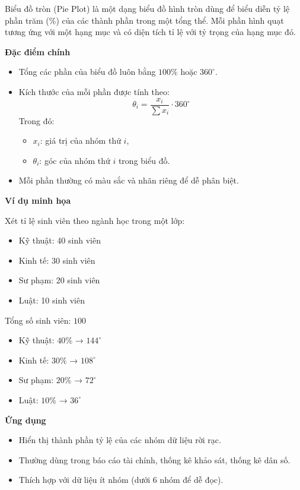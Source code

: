 Biểu đồ tròn (Pie Plot) là một dạng biểu đồ hình tròn dùng để biểu diễn tỷ lệ phần trăm (\%) của các thành phần trong một tổng thể. Mỗi phần hình quạt tương ứng với một hạng mục và có diện tích tỉ lệ với tỷ trọng của hạng mục đó.

\textbf{Đặc điểm chính}

\begin{itemize}
    \item Tổng các phần của biểu đồ luôn bằng \(100\%\) hoặc \(360^\circ\).
    \item Kích thước của mỗi phần được tính theo:
    \[
    \theta_i = \frac{x_i}{\sum x_i} \cdot 360^\circ
    \]
    Trong đó:
    \begin{itemize}
        \item \( x_i \): giá trị của nhóm thứ \(i\),
        \item \( \theta_i \): góc của nhóm thứ \(i\) trong biểu đồ.
    \end{itemize}
    \item Mỗi phần thường có màu sắc và nhãn riêng để dễ phân biệt.
\end{itemize}

\textbf{Ví dụ minh họa}

Xét tỉ lệ sinh viên theo ngành học trong một lớp:

\begin{itemize}
    \item Kỹ thuật: 40 sinh viên
    \item Kinh tế: 30 sinh viên
    \item Sư phạm: 20 sinh viên
    \item Luật: 10 sinh viên
\end{itemize}

Tổng số sinh viên: \(100\)

\begin{itemize}
    \item Kỹ thuật: \(40\%\) → \(144^\circ\)
    \item Kinh tế: \(30\%\) → \(108^\circ\)
    \item Sư phạm: \(20\%\) → \(72^\circ\)
    \item Luật: \(10\%\) → \(36^\circ\)
\end{itemize}

\textbf{Ứng dụng}

\begin{itemize}
    \item Hiển thị thành phần tỷ lệ của các nhóm dữ liệu rời rạc.
    \item Thường dùng trong báo cáo tài chính, thống kê khảo sát, thống kê dân số.
    \item Thích hợp với dữ liệu ít nhóm (dưới 6 nhóm để dễ đọc).
\end{itemize}


